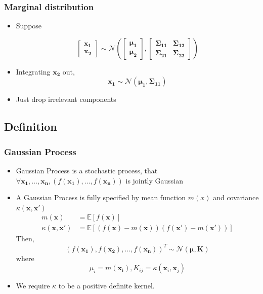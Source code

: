 \documentclass{beamer}
\begin{document}
\begin{frame}
	\frametitle{Marginal distribution}
	\begin{itemize}
		\item Suppose

		\[\left[ {\begin{array}{*{20}{c}}
			{\bm{x_1}}\\
			{\bm{x_2}}
			\end{array}} \right] \sim \mathcal{N}\left( {\left[ {\begin{array}{*{20}{c}}
				{\bm{\mu _1}}\\
				{\bm{\mu _2}}
				\end{array}} \right],\left[ {\begin{array}{*{20}{c}}
				{\bm{\Sigma _{11}}}&{\bm{\Sigma _{12}}}\\
				{\bm{\Sigma _{21}}}&{\bm{\Sigma _{22}}}
				\end{array}} \right]} \right)\]

		\item Integrating $\bm{x_2}$ out, 
		\[
			\bm{x_1} \sim \mathcal{N}(\bm{\mu_1}, \bm{\Sigma_{11}})
		\]
		\item Just drop irrelevant components
	\end{itemize}
\end{frame}

\subsection{Definition}
\begin{frame}
	\frametitle{Gaussian Process}
	\begin{itemize}
		\item Gaussian Process is a stochastic process, that $\forall \mathbf{x_1}, \ldots, \mathbf{x_n}, (f(\mathbf{x_1}), \ldots, f(\mathbf{x_n}))$ is jointly Gaussian
		\item A Gaussian Process is fully specified by mean function $m(x)$ and covariance $\kappa(\mathbf{x}, \mathbf{x'})$
		\begin{align*}
				m(\mathbf{x}) &= \mathbb{E}[f(\mathbf{x})] \\
				\kappa(\mathbf{\mathbf{x}}, \mathbf{\mathbf{x'}}) &= \mathbb{E}[(f(\mathbf{x})-m(\mathbf{x}))(f(\mathbf{x'})-m(\mathbf{x'}))]				
		\end{align*}	
		Then, 
		\[
			 (f(\mathbf{x_1}), f(\mathbf{x_2}), \ldots, f(\mathbf{x_n}))^T \sim \mathcal{N}(\mathbf{\mu}, \mathbf{K})			 
		\]
		where
		\[
			\mu_i = m(\mathbf{x_i}), K_{ij} = \kappa(\mathbf{x}_i, \mathbf{x}_j)
		\]
		\item We require $\kappa$ to be a positive definite kernel.
	\end{itemize}
\end{frame}
\end{document}
